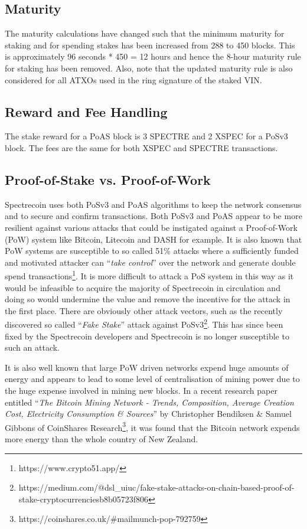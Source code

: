 \subsection{Maturity}
The maturity calculations have changed such that the minimum maturity for
staking and for spending stakes has been increased from 288 to 450 blocks.
This is approximately 96 seconds * 450 = 12 hours and hence the 8-hour
maturity rule for staking has been removed. Also, note that the updated
maturity rule is also considered for all ATXOs used in the ring signature
of the staked VIN.



\subsection{Reward and Fee Handling}
The stake reward for a PoAS block is 3 SPECTRE and 2 XSPEC for a PoSv3 block.
The fees are the same for both XSPEC and SPECTRE transactions.



\subsection{Proof-of-Stake vs. Proof-of-Work}
Spectrecoin uses both PoSv3 and PoAS algorithms to keep the network consensus
and to secure and confirm transactions. Both PoSv3 and PoAS appear to be more
resilient against various attacks that could be instigated against a
Proof-of-Work (PoW) system like Bitcoin, Litecoin and DASH for example.
It is also known that PoW systems are susceptible to so called 51\% attacks
where a sufficiently funded and motivated attacker can “\textit{take control}” over
the network and generate double spend transactions\footnote{https://www.crypto51.app/}. 
It is more difficult to attack a PoS system in this way as it would be infeasible 
to acquire the majority of Spectrecoin in circulation and doing so would undermine 
the value and remove the incentive for the attack in the first place. There are 
obviously other attack vectors, such as the recently discovered so called 
“\textit{Fake Stake}” attack against 
PoSv3\footnote{https://medium.com/@dsl\_uiuc/fake-stake-attacks-on-chain-based-proof-of-stake-cryptocurrenciesb8b05723f806}. 
This has since been fixed by the Spectrecoin developers and Spectrecoin is no 
longer susceptible to such an attack.



It is also well known that large PoW driven networks expend huge amounts of
energy and appears to lead to some level of centralisation of mining power
due to the huge expense involved in mining new blocks. In a recent research
paper entitled “\textit{The Bitcoin Mining Network - Trends, Composition, Average
Creation Cost, Electricity Consumption \& Sources}” by Christopher Bendiksen
\& Samuel Gibbons of CoinShares 
Research\footnote{https://coinshares.co.uk/\#mailmunch-pop-792759}, 
it was found that the Bitcoin network expends more energy than the whole 
country of New Zealand.



